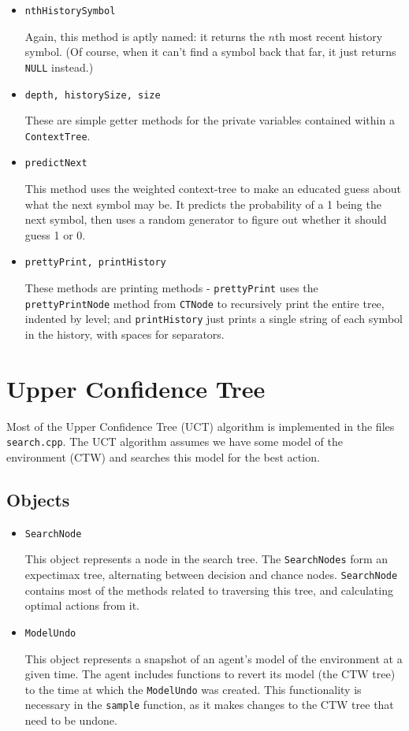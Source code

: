 \documentclass[pdftex,twoside,a4paper]{report}
\begin{document}
\begin{itemize}
{    This is a simple getter method for the weighted probability of the root - which is the probability of the entire context tree.
  }
\item{\texttt{nthHistorySymbol}
    
    Again, this method is aptly named: it returns the $n$th most recent history symbol. (Of course, when it can't find a symbol back that far, it just returns \texttt{NULL} instead.)
  }
\item{\texttt{depth, historySize, size}
    
    These are simple getter methods for the private variables contained within a \texttt{ContextTree}.
  }
\item{\texttt{predictNext}
    
    This method uses the weighted context-tree to make an educated guess about what the next symbol may be. It predicts the probability of a 1 being the next symbol, then uses a random generator to figure out whether it should guess 1 or 0.
  }
\item{\texttt{prettyPrint, printHistory}
    
    These methods are printing methods - \texttt{prettyPrint} uses the \texttt{prettyPrintNode} method from \texttt{CTNode} to recursively print the entire tree, indented by level; and \texttt{printHistory} just prints a single string of each symbol in the history, with spaces for separators.
  }
\end{itemize}
\section{Upper Confidence Tree}
Most of the Upper Confidence Tree (UCT) algorithm is implemented in the files \texttt{search.cpp}. The UCT algorithm assumes we have some model of the environment (CTW) and searches this model for the best action.
\subsection{Objects}
\begin{itemize}
	\item{\texttt{SearchNode}
	
	This object represents a node in the search tree. The \texttt{SearchNodes} form an expectimax tree, alternating between decision and chance nodes. \texttt{SearchNode} contains most of the methods related to traversing this tree, and calculating optimal actions from it.
	}
	
	\item{\texttt{ModelUndo}
	
	This object represents a snapshot of an agent's model of the environment at a given time. The agent includes functions to revert its model (the CTW tree) to the time at which the \texttt{ModelUndo} was created. This functionality is necessary in the \texttt{sample} function, as it makes changes to the CTW tree that need to be undone.
	
	}
\end{itemize}
\end{document}
